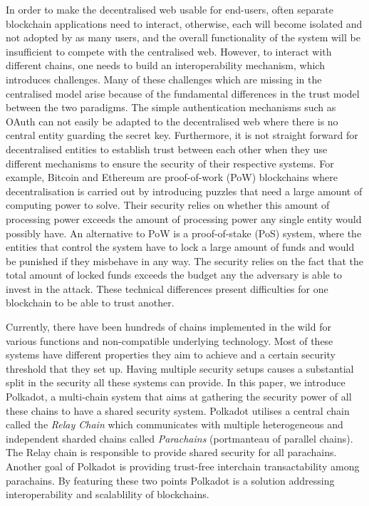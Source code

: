 In order to make the decentralised web usable for end-users, often separate blockchain applications need to interact, otherwise, each will become isolated and not adopted by as many users, and the overall functionality of the system will be insufficient to compete with the centralised web. However, to interact with different chains, one needs to build an interoperability mechanism, which introduces challenges. Many of these challenges which are missing in the centralised model arise because of the fundamental differences in the trust model between the two paradigms. The simple authentication mechanisms such as OAuth \cite{hardt2012oauth} can not easily be adapted to the decentralised web where there is no central entity guarding the secret key. Furthermore, it is not straight forward for decentralised entities to establish trust between each other when they use different mechanisms to ensure the security of their respective systems. For example, Bitcoin\cite{} and Ethereum\cite{} are proof-of-work (PoW) blockchains where decentralisation is carried out by introducing puzzles that need a large amount of computing power to solve. Their security relies on whether this amount of processing power exceeds the amount of processing power any single entity would possibly have. An alternative to PoW is a proof-of-stake (PoS) system, where the entities that control the system have to lock a large amount of funds and would be punished if they misbehave in any way. The security relies on the fact that the total amount of locked funds exceeds the budget any the adversary is able to invest in the attack. These technical differences present difficulties for one blockchain to be able to trust another.

Currently, there have been hundreds of chains implemented in the wild for various functions and non-compatible underlying technology. Most of these systems have different properties they aim to achieve and a certain security threshold that they set up. Having multiple security setups causes a substantial split in the security all these systems can provide. In this paper, we introduce Polkadot, a multi-chain system that aims at gathering the security power of all these chains to have a shared security system. Polkadot utilises a central chain called the \emph{Relay Chain} which communicates with multiple heterogeneous and independent sharded chains called \emph{Parachains} (portmanteau of parallel chains). The Relay chain is responsible to provide shared security for all parachains. Another goal of Polkadot is providing trust-free interchain transactability among parachains. By featuring these two points Polkadot is a solution addressing interoperability and scalablility of blockchains.

